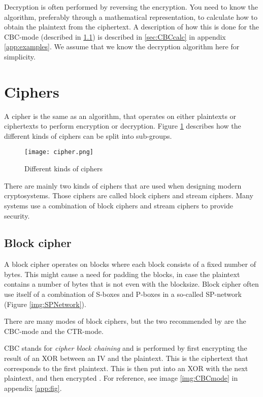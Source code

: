 Decryption is often performed by reversing the encryption. You need to know the 
algorithm, preferably through a mathematical representation, to calculate how 
to obtain the plaintext from the ciphertext. A description of how this is done 
for the CBC-mode (described in \ref{sec:BlockCipher}) is described in 
\ref{sec:CBCcalc} in appendix \ref{app:examples}. We assume that we know the 
decryption algorithm here for simplicity. 

\section{Ciphers}
A cipher is the same as an algorithm, that operates on either plaintexts or 
ciphertexts to perform encryption or decryption. Figure \ref{img:ciphers} 
describes how the different kinds of ciphers can be split into sub-groups.

\begin{figure}
  \texttt{[image: cipher.png]}
  \caption{Different kinds of ciphers \citep{CipherTax:2013}}
  \label{img:ciphers}
\end{figure}

There are mainly two kinds of ciphers that are used when designing modern 
cryptosystems. Those ciphers are called block ciphers and stream ciphers. 
Many systems use a combination of block ciphers and stream ciphers to provide 
security. 

\subsection{Block cipher}\label{sec:BlockCipher}
A block cipher operates on blocks where each block consists of a fixed number 
of bytes. This might cause a need for padding the blocks, in case the plaintext 
contains a number of bytes that is not even with the blocksize. Block cipher 
often use itself of a combination of S-boxes and P-boxes in a so-called 
SP-network (Figure \ref{img:SPNetwork}).

There are many modes of block ciphers, but the two recommended by 
\citet{Schneier:2003} are the CBC-mode and the CTR-mode.

CBC stands for \emph{cipher block chaining} and is performed by first encrypting 
the result of an XOR between an IV and the plaintext. This is the ciphertext 
that corresponds to the first plaintext. This is then put into an XOR with the 
next plaintext, and then encrypted \citep[pp. 109--111]{Stinson:2006}. For 
reference, see image \ref{img:CBCmode} in appendix \ref{app:fig}.

